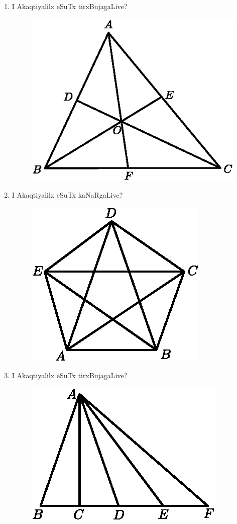\begin{enumerate}
\item I Akaqtiyalilx eSuTx tirxBujagaLive?
\begin{figure}[H]
\centering
\includegraphics{src/figures/exr7.eps}
\end{figure}

\item I Akaqtiyalilx eSuTx kaNaRgaLive?
\begin{figure}[H]
\centering
\includegraphics{src/figures/exr8.eps}
\end{figure}

\item I Akaqtiyalilx eSuTx tirxBujagaLive?
\begin{figure}[H]
\centering
\includegraphics{src/figures/exr9.eps}
\end{figure}


\end{enumerate}
